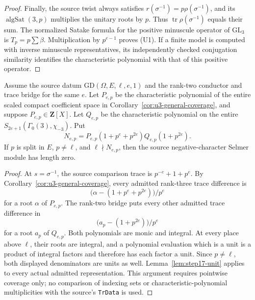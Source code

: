 \begin{proof}
Finally, the source twist always satisfies
$r(\sigma^{-1})=p\rho(\sigma^{-1})$, and its
$\operatorname{algSat}(3,p)$ multiplies the unitary roots by $p$.
Thus $\operatorname{tr}\rho(\sigma^{-1})$ equals their sum.
The normalized Satake formula for the positive minuscule operator of
$\mathrm{GL}_3$ is $T_p=p\sum\beta$.
Multiplication by $p^{e-1}$ proves (U1).
If a finite model is computed with inverse minuscule representatives,
its independently checked conjugation similarity identifies the
characteristic polynomial with that of this positive operator.
\end{proof}

\begin{corollary}
\label{cor:general-hecke-unit}
Assume the source datum $\mathrm{GD}(\Omega,E,\ell,e,1)$ and the
rank-two conductor and trace bridge for the same $e$.
Let $P_{e,p}$ be the characteristic polynomial of the entire scaled
compact coefficient space in Corollary~\ref{cor:u3-general-coverage},
and suppose $P_{e,p}\in\mathbf Z[X]$.
Let $Q_{e,p}$ be the characteristic polynomial on the entire
$S_{2e+1}(\Gamma_0(3),\chi_{-3})$.
Put
\[
 N_{e,p}=P_{e,p}(1+p^e+p^{2e})Q_{e,p}(1+p^{2e}).
\]
If $p$ is split in $E$, $p\ne\ell$, and $\ell\nmid N_{e,p}$, then the
source negative-character Selmer module has length zero.
\end{corollary}

\begin{proof}
At $s=\sigma^{-1}$, the source comparison trace is
$p^{-e}+1+p^e$.
By Corollary~\ref{cor:u3-general-coverage}, every admitted rank-three
trace difference is
\[
 \bigl(\alpha-(1+p^e+p^{2e})\bigr)/p^e
\]
for a root $\alpha$ of $P_{e,p}$.
The rank-two bridge puts every other admitted trace difference in
\[
 \bigl(a_p-(1+p^{2e})\bigr)/p^e
\]
for a root $a_p$ of $Q_{e,p}$.
Both polynomials are monic and integral. At every place above $\ell$,
their roots are integral, and a polynomial evaluation which is a unit
is a product of integral factors and therefore has each factor a unit.
Since $p\ne\ell$, both displayed denominators are units as well.
Lemma~\ref{lem:step17-unit} applies to every actual admitted
representation. This argument requires pointwise coverage only; no
comparison of indexing sets or characteristic-polynomial
multiplicities with the source's \texttt{TrData} is used.
\end{proof}
